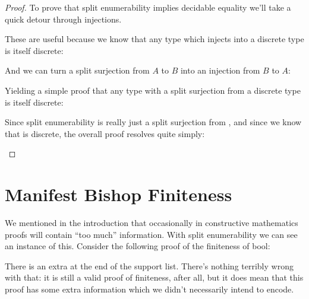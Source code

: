 \begin{proof}
To prove that split enumerability implies decidable equality we'll take a quick
detour through injections.
\begin{multicols}{2}
  \begin{agdalisting}
  \end{agdalisting} \columnbreak
  \begin{agdalisting}
  \end{agdalisting}
\end{multicols} \vspace{-\baselineskip} \noindent
These are useful because we know that any type which injects into a discrete
type is itself discrete:
\begin{agdalisting}
\end{agdalisting}
And we can turn a split surjection from \(A\) to \(B\) into an injection from
\(B\) to \(A\): 
\begin{agdalisting}
\end{agdalisting}
Yielding a simple proof that any type with a split surjection from a discrete
type is itself discrete:
\begin{agdalisting}
\end{agdalisting}
Since split enumerability is really just a split surjection from
, and since we know that  is discrete, the
overall proof resolves quite simply:
\begin{agdalisting} \label{split-enum-discrete}
\end{agdalisting}
\end{proof}
\section{Manifest Bishop Finiteness} \label{manifest-bishop-finiteness}
We mentioned in the introduction that occasionally in constructive mathematics
proofs will contain ``too much'' information.
With split enumerability we can see an instance of this.
Consider the following proof of the finiteness of bool:
\begin{agdalisting} \label{op-slop}
\end{agdalisting}
There is an extra  at the end of the support
list.
There's nothing terribly wrong with that: it is still a valid proof of
finiteness, after all, but it does mean that this proof has some extra
information which we didn't necessarily intend to encode.


